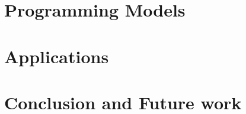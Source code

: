 \documentclass[11pt]{ucthesis}
\begin{document}
\chapter{Programming Models}
\label{chapter:programming_models}


\chapter{Applications}
\label{chapter:app}


\chapter{Conclusion and Future work}
\label{chapter:summary}



  

\end{document}
